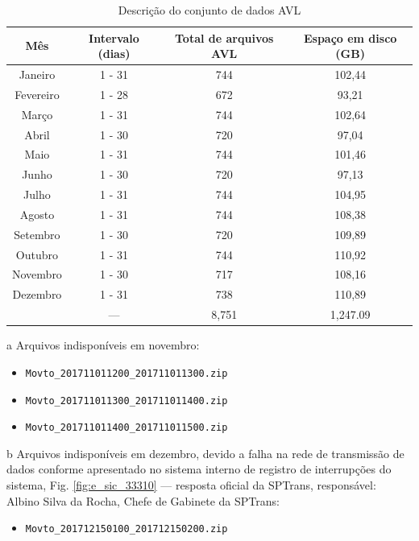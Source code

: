 \documentclass[
	12pt,				%
	oneside,			%
	a4paper,			%
	english,			%
	brazil				%
	]{abntex2ppgsi}
\begin{document}
\begin{table}[!htb]
\begin{threeparttable}
\centering
\caption{Descrição do conjunto de dados AVL}
\label{tab:avlDataset}
\begin{tabular}{ c | c | c | c }
\toprule
\textbf{Mês} & \textbf{Intervalo (dias)} & \textbf{Total de arquivos AVL} & \textbf{Espaço em disco (GB)} \\
\midrule
Janeiro\tnote{c} & 1 - 31 & 744 & 102,44 \\
\hline
 Fevereiro & 1 - 28 & 672 & 93,21 \\
\hline
 Março & 1 - 31 & 744 & 102,64 \\
\hline
 Abril & 1 - 30 & 720 & 97,04 \\
\hline
 Maio & 1 - 31 & 744 & 101,46 \\
\hline
 Junho & 1 - 30 & 720 & 97,13 \\
\hline
 Julho & 1 - 31 & 744 & 104,95 \\
\hline
 Agosto & 1 - 31 & 744 & 108,38 \\
\hline
 Setembro & 1 - 30 & 720 & 109,89 \\
\hline
 Outubro & 1 - 31 & 744 & 110,92 \\
\hline
 Novembro\tnote{a} & 1 - 30 & 717 & 108,16 \\
\hline
 Dezembro\tnote{b} & 1 - 31 & 738 & 110,89 \\
\midrule
{} & --- & 8,751 & 1,247.09 \\
\bottomrule
\end{tabular}
\begin{tablenotes}
\item[a]Arquivos indisponíveis em novembro: 
\begin{itemize}
\item \texttt{Movto\_201711011200\_201711011300.zip}
\item \texttt{Movto\_201711011300\_201711011400.zip}
\item \texttt{Movto\_201711011400\_201711011500.zip}
\end{itemize}
\item[b]Arquivos indisponíveis em dezembro, devido a falha na rede de transmissão de dados conforme apresentado no sistema interno de registro de interrupções do sistema, Fig. \ref{fig:e_sic_33310} --- resposta oficial da SPTrans, responsável: Albino Silva da Rocha, Chefe de Gabinete da SPTrans: 
\begin{itemize}
\item \texttt{Movto\_201712150100\_201712150200.zip}

\end{itemize}
\end{tablenotes}
\end{threeparttable}
\end{table}
\end{document}
